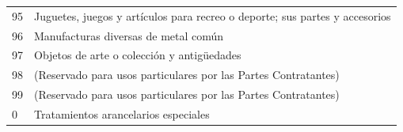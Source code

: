 \documentclass[a4paper,openright,12pt]{book}
\begin{document}
\begin{table}[]
{\begin{tabular}{@{}ll@{}}
    95  & Juguetes, juegos y artículos para recreo o deporte; sus partes y accesorios                                                                                                                                                                                                                    \\
    96  & Manufacturas diversas de metal común                                                                                                                                                                                                                                                           \\
    97  & Objetos de arte o colección y antigüedades                                                                                                                                                                                                                                                     \\
    98  & (Reservado para usos particulares por las Partes Contratantes)                                                                                                                                                                                                                                 \\
    99  & (Reservado para usos particulares por las Partes Contratantes)                                                                                                                                                                                                                                 \\
    0   & Tratamientos arancelarios especiales                                                                                                                                                                                                                                                           \\ \bottomrule
    \end{tabular}%
    }
\end{table}


\cleardoublepage
{}

\end{document}
